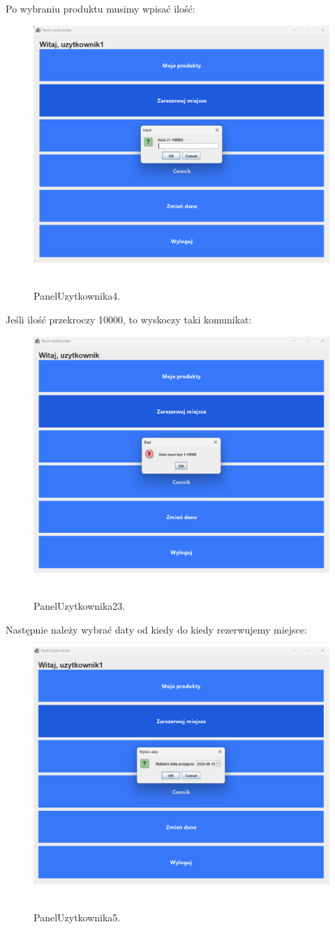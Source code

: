 Po wybraniu produktu musimy wpisać ilość:
\begin{figure}[H]
    \centering
    \includegraphics[width=.7\linewidth]{figures/Paneluzytkownika4.png}\
    \caption{PanelUzytkownika4.\label{PanelUzytkownika4}}
\end{figure}
Jeśli ilość przekroczy 10000, to wyskoczy taki komunikat:
\begin{figure}[H]
    \centering
    \includegraphics[width=.7\linewidth]{figures/PanelUzytkownika23.png}\
    \caption{PanelUzytkownika23.\label{PanelUzytkownika23}}
\end{figure}
Następnie należy wybrać daty od kiedy do kiedy rezerwujemy miejsce:
\begin{figure}[H]
    \centering
    \includegraphics[width=.7\linewidth]{figures/PanelUzytkownika5.png}\
    \caption{PanelUzytkownika5.\label{PanelUzytkownika5}}
\end{figure}
